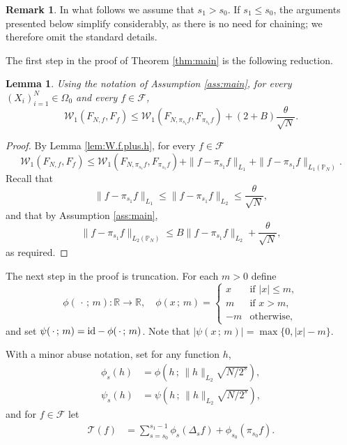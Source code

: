 \documentclass[11pt]{amsart}
\newcommand{\R}{\mathbb{R}}
\newcommand{\W}{\mathcal{W}}
\newtheorem{lemma}[theorem]{Lemma}
\theoremstyle{definition}
\newtheorem{remark}[theorem]{Remark}
\renewcommand{\P}{\mathbb{P}}
\numberwithin{equation}{section}
\begin{document}
\begin{remark}
In what follows we assume that $s_{1}>s_{0}$.
If $s_{1}\leq s_{0}$, the arguments presented below simplify considerably, as there is no need for  chaining; we therefore omit the standard details.
\end{remark}

The first step in the proof of Theorem \ref{thm:main} is the following  reduction.

\begin{lemma}
\label{lem:reduction.to.s1}
Using the notation of Assumption \ref{ass:main}, for every $(X_{i})_{i=1}^{N}\in\Omega_{0}$ and every $f\in\mathcal{F}$, 
\[ \W_{1}(F_{N,f}, F_{f} )
\leq  \W_{1}(F_{N,\pi_{s_{1}} f}, F_{\pi_{s_{1}} f} ) + (2+ B) \frac{\theta}{\sqrt N}.\]
\end{lemma}
\begin{proof}
By Lemma \ref{lem:W.f.plus.h}, for every $f\in\mathcal{F}$
\[ \W_{1}(F_{N,f}, F_{f} )
\leq  \W_{1}(F_{N,\pi_{s_{1}} f}, F_{\pi_{s_{1}} f} ) + \| f-\pi_{s_{1}} f \|_{L_{1}} + \|f-\pi_{s_{1}} f \|_{L_{1}(\P_{N})}.\]
Recall that 
\[  \| f-\pi_{s_{1}} f \|_{L_{1}} 
\leq  \| f-\pi_{s_{1}} f \|_{L_{2}}
 \leq \frac{\theta}{\sqrt N},\]
 and that  by Assumption \ref{ass:main},
\[ \|f-\pi_{s_{1}} f \|_{L_{2}(\P_{N})}
\leq B \| f-\pi_{s_{1}} f \|_{L_{2}} + \frac{\theta}{\sqrt N}, \]
as required. 
\end{proof}


The next step in the proof is truncation.
For each $m>0$ define
\[
\phi( \,\cdot  \, ;\,  m)\colon\R\to\R,
\quad
\phi( x  \, ;\,  m)=
\begin{cases}
x  &\text{if } |x|\leq m,\\
m &\text{if }  x>m, \\
-m  & \text{otherwise},
\end{cases}
\]
and set $\psi( \,\cdot  \, ;\,  m)={\rm id}-\phi( \,\cdot  \, ;\,  m)$.
Note that $|\psi(x\, ;\,  m)| = \max\{0,|x|-m\}$.

With a  minor abuse notation, set for any function $h$,
\begin{align*}
  \phi_{s}(h) 
&=\phi\left(h \, ;\,  \| h   \|_{L_{2}} \sqrt{ N/2^{s} } \right),\\
 \psi_{s}(h) 
&=\psi\left(h \, ;\,  \| h   \|_{L_{2}} \sqrt{ N/2^{s} } \right),
 \end{align*} 
 and  for  $f\in\mathcal{F}$ let 
\begin{align*}
 \mathcal{T}(f) &= \sum_{s=s_{0}}^{s_{1}-1} \phi_{s }(\Delta_{s}f) + \phi_{s_{0}} (\pi_{s_0}f).
 \end{align*}
\end{document}
